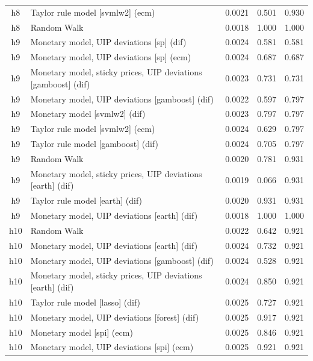 \begin{ThreePartTable}
\begin{longtable}[t]{cp{5.5cm}ccc}
h8 & \raggedright Taylor rule model [svmlw2] (ecm) & 0.0021 & 0.501 & 0.930\\
h8 & \raggedright Random Walk & 0.0018 & 1.000 & 1.000\\
\addlinespace
h9 & \raggedright Monetary model, UIP deviations [sp] (dif) & 0.0024 & 0.581 & 0.581\\
h9 & \raggedright Monetary model, UIP deviations [sp] (ecm) & 0.0024 & 0.687 & 0.687\\
h9 & \raggedright Monetary model, sticky prices, UIP deviations [gamboost] (dif) & 0.0023 & 0.731 & 0.731\\
h9 & \raggedright Monetary model, UIP deviations [gamboost] (dif) & 0.0022 & 0.597 & 0.797\\
h9 & \raggedright Monetary model [svmlw2] (dif) & 0.0023 & 0.797 & 0.797\\
h9 & \raggedright Taylor rule model [svmlw2] (ecm) & 0.0024 & 0.629 & 0.797\\
h9 & \raggedright Taylor rule model [gamboost] (dif) & 0.0024 & 0.705 & 0.797\\
h9 & \raggedright Random Walk & 0.0020 & 0.781 & 0.931\\
h9 & \raggedright Monetary model, sticky prices, UIP deviations [earth] (dif) & 0.0019 & 0.066 & 0.931\\
h9 & \raggedright Taylor rule model [earth] (dif) & 0.0020 & 0.931 & 0.931\\
h9 & \raggedright Monetary model, UIP deviations [earth] (dif) & 0.0018 & 1.000 & 1.000\\
\addlinespace
h10 & \raggedright Random Walk & 0.0022 & 0.642 & 0.921\\
h10 & \raggedright Monetary model, UIP deviations [earth] (dif) & 0.0024 & 0.732 & 0.921\\
h10 & \raggedright Monetary model, UIP deviations [gamboost] (dif) & 0.0024 & 0.528 & 0.921\\
h10 & \raggedright Monetary model, sticky prices, UIP deviations [earth] (dif) & 0.0024 & 0.850 & 0.921\\
h10 & \raggedright Taylor rule model [lasso] (dif) & 0.0025 & 0.727 & 0.921\\
h10 & \raggedright Monetary model, UIP deviations [forest] (dif) & 0.0025 & 0.917 & 0.921\\
h10 & \raggedright Monetary model [spi] (ecm) & 0.0025 & 0.846 & 0.921\\
h10 & \raggedright Monetary model, UIP deviations [spi] (ecm) & 0.0025 & 0.921 & 0.921\\

\end{longtable}
\end{ThreePartTable}

